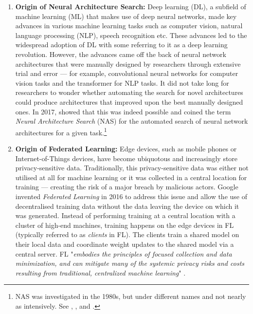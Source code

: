 \begin{enumerate}
    \item \textbf{Origin of Neural Architecture Search:} Deep learning (DL), a subfield of machine learning (ML) that makes use of deep neural networks, made key advances in various machine learning tasks such as computer vision, natural language processing (NLP), speech recognition etc. These advances led to the widespread adoption of DL with some referring to it as a deep learning revolution. However, the advances came off the back of neural network architectures that were manually designed by researchers through extensive trial and error — for example, convolutional neural networks for computer vision tasks and the transformer for NLP tasks. It did not take long for researchers to wonder whether automating the search for novel architectures could produce architectures that improved upon the best manually designed ones. In 2017, \cite{nas_with_rl_2017} showed that this was indeed possible and coined the term \textit{Neural Architecture Search} (NAS) for the automated search of neural network architectures for a given task.\footnote{NAS was investigated in the 1980s, but under different names and not nearly as intensively. See \cite{self_organizing_nn_1988}, \cite{genetic_algo_nas_1989}, \cite{desgning_nn_with_genetic_algo_1990} and \cite{evo_rnn_nas_1994}.}
    \item \textbf{Origin of Federated Learning:} Edge devices, such as mobile phones or Internet-of-Things devices, have become ubiquotous and increasingly store privacy-sensitive data. Traditionally, this privacy-sensitive data was either not utilised at all for machine learning or it was collected in a central location for training — creating the risk of a major breach by malicious actors. Google invented \textit{Federated Learning} in 2016 to address this issue and allow the use of decentralised training data without the data leaving the device on which it was generated. Instead of performing training at a central location with a cluster of high-end machines, training happens on the edge devices in FL (typically referred to as \textit{clients} in FL). The clients train a shared model on their local data and coordinate weight updates to the shared model via a central server. FL "\textit{embodies the principles of focused collection and data minimization, and can mitigate many of the systemic privacy risks and costs resulting from traditional, centralized machine learning}" \cite{fl_advances_and_open_problems_2021}.
\end{enumerate}

